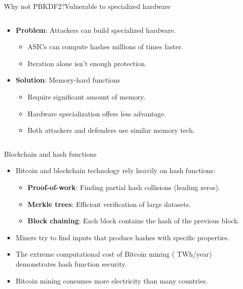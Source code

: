 \documentclass[aspectratio=169, lualatex, handout]{beamer}
\begin{document}
\begin{frame}{Why not PBKDF2?}{Vulnerable to specialized hardware}
	\begin{columns}[c]
		\begin{column}{0.6\textwidth}
			\begin{itemize}[<+->]
				\item \textbf{Problem}: Attackers can build specialized hardware.
				      \begin{itemize}
					      \item ASICs can compute hashes millions of times faster.
					      \item Iteration alone isn't enough protection.
				      \end{itemize}
				\item \textbf{Solution}: Memory-hard functions
				      \begin{itemize}
					      \item Require significant amount of memory.
					      \item Hardware specialization offers less advantage.
					      \item Both attackers and defenders use similar memory tech.
				      \end{itemize}
			\end{itemize}
		\end{column}
		\begin{column}{0.4\textwidth}
		\end{column}
	\end{columns}
\end{frame}

\begin{frame}{Blockchain and hash functions}
	\begin{itemize}[<+->]
		\item Bitcoin and blockchain technology rely heavily on hash functions:
		      \begin{itemize}
			      \item \textbf{Proof-of-work}: Finding partial hash collisions (leading zeros).
			      \item \textbf{Merkle trees}: Efficient verification of large datasets.
			      \item \textbf{Block chaining}: Each block contains the hash of the previous block.
		      \end{itemize}
		\item Miners try to find inputs that produce hashes with specific properties.
		\item The extreme computational cost of Bitcoin mining ( TWh/year) demonstrates hash function security.
		\item Bitcoin mining consumes more electricity than many countries.
	\end{itemize}
\end{frame}
\end{document}
